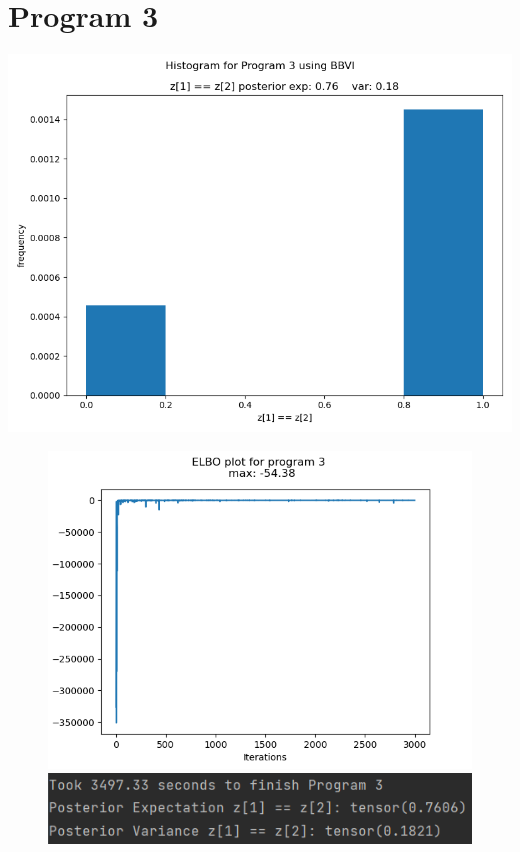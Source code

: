 \documentclass[10pt]{homeworg}
\begin{document}

\section*{Program 3}
\begin{center}
\includegraphics[scale=0.5]{figures/BBVI_program_3.png}
\end{center}

\begin{figure}[!htbp]
    \centering
    \begin{minipage}{0.45\textwidth}
        \centering
       \includegraphics[scale=0.5]{figures/elbo_program_3.png}
    \end{minipage}\hfill
    \begin{minipage}{0.45\textwidth}
        \centering
        \includegraphics[scale=0.8]{figures/program3_time.png}
    \end{minipage}
\end{figure}
\end{document}
